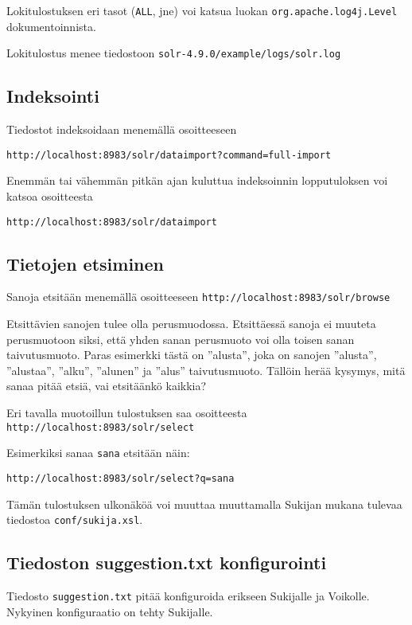 \documentclass[12pt,a4paper]{scrartcl}
\begin{document}
Lokitulostuksen eri tasot (\verb=ALL=, jne) voi katsua luokan
\verb=org.apache.log4j.Level= dokumentoinnista.

Lokitulostus menee tiedostoon \verb=solr-4.9.0/example/logs/solr.log=


\subsection*{Indeksointi}

Tiedostot indeksoidaan menemällä osoitteeseen

\verb|http://localhost:8983/solr/dataimport?command=full-import|

Enemmän tai vähemmän pitkän ajan kuluttua indeksoinnin lopputuloksen
voi katsoa osoitteesta

\verb|http://localhost:8983/solr/dataimport|


\subsection*{Tietojen etsiminen}

Sanoja etsitään menemällä osoitteeseen
\verb=http://localhost:8983/solr/browse=

Etsittävien sanojen tulee olla perusmuodossa. Etsittäessä sanoja ei
muuteta perusmuotoon siksi, että yhden sanan perusmuoto voi olla
toisen sanan taivutusmuoto. Paras esimerkki tästä on ''alusta'', joka
on sanojen ''alusta'', ''alustaa'', ''alku'', ''alunen'' ja ''alus''
taivutusmuoto. Tällöin herää kysymys, mitä sanaa pitää etsiä, vai
etsitäänkö kaikkia?


Eri tavalla muotoillun tulostuksen saa osoitteesta \\
\verb=http://localhost:8983/solr/select=

Esimerkiksi sanaa \verb=sana= etsitään näin:

\verb|http://localhost:8983/solr/select?q=sana|

Tämän tulostuksen ulkonäköä voi muuttaa muuttamalla Sukijan mukana
tulevaa tiedostoa \verb=conf/sukija.xsl=.


\subsection*{Tiedoston suggestion.txt konfigurointi}

Tiedosto \verb|suggestion.txt| pitää konfiguroida erikseen Sukijalle
ja Voikolle. Nykyinen konfiguraatio on tehty Sukijalle.
\end{document}
